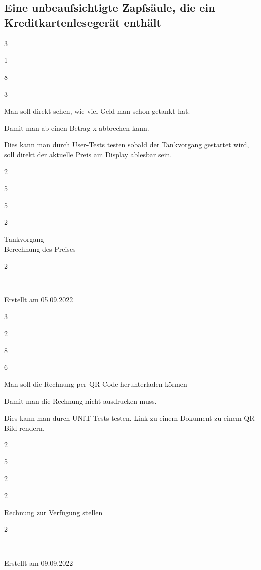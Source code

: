 \documentclass[12pt]{article}
\newenvironment{myreq}[1]{%
\setlist[description]{font=\normalfont\color{darkgray}}%
\begin{tcolorbox}[colframe=black,colback=white, sharp corners, boxrule=1pt]%
\bfseries\color{blue}%
\begin{description}#1}%
{\end{description}\end{tcolorbox}}
\newcommand{\threeinline}[3]{\begin{multicols}{3}#1 #2 #3\end{multicols}}
\newcommand{\twoinline}[2]{\begin{multicols}{2}#1 #2\end{multicols}}
\newcommand{\reqno}{\item[Requirement \#:]}
\newcommand{\reqtype}{\item[Requirement Type:]}
\newcommand{\reqevent}{\item[Event/BUC/PUC \#:]}
\newcommand{\reqdesc}{\item[Description:]}
\newcommand{\reqrat}{\item[Rationale:]}
\newcommand{\reqfit}{\item[Fit Criterion:]}
\newcommand{\reqsatis}{\item[Customer Satisfaction:]}
\newcommand{\reqdissat}{\item[Customer Dissatisfaction:]}
\newcommand{\reqdep}{\item[Dependencies:]}
\newcommand{\reqconf}{\item[Conflicts:]}
\newcommand{\reqmater}{\item[Materials:]}
\newcommand{\reqhist}{\item[History:]}
\begin{document}
\subsection{Eine unbeaufsichtigte Zapfsäule, die ein Kreditkartenlesegerät enthält}
\begin{myreq}
  \threeinline
    {\reqno 1}
    {\reqtype 8}
    {\reqevent 3}
  \reqdesc Man soll direkt sehen, wie viel Geld man schon getankt hat.
  \reqrat Damit man ab einen Betrag x abbrechen kann.
  \reqfit Dies kann man durch User-Tests testen sobald der Tankvorgang gestartet wird, soll direkt der aktuelle Preis am Display ablesbar sein.
  \twoinline
    {\reqsatis 5}
    {\reqdissat 5}
  \twoinline
  {\reqdep Tankvorgang\\Berechnung des Preises}
  {\reqconf 2}
  \reqmater -
  \reqhist Erstellt am 05.09.2022
\end{myreq}
\begin{myreq}
  \threeinline
    {\reqno 2}
    {\reqtype 8}
    {\reqevent 6}
  \reqdesc Man soll die Rechnung per QR-Code herunterladen können
  \reqrat Damit man die Rechnung nicht ausdrucken muss.
  \reqfit Dies kann man durch UNIT-Tests testen. Link zu einem Dokument zu einem QR-Bild rendern.
  \twoinline
    {\reqsatis 5}
    {\reqdissat 2}
  \twoinline
  {\reqdep Rechnung zur Verfügung stellen }
  {\reqconf 2}
  \reqmater -
  \reqhist Erstellt am 09.09.2022
\end{myreq}

\pagebreak
\end{document}
